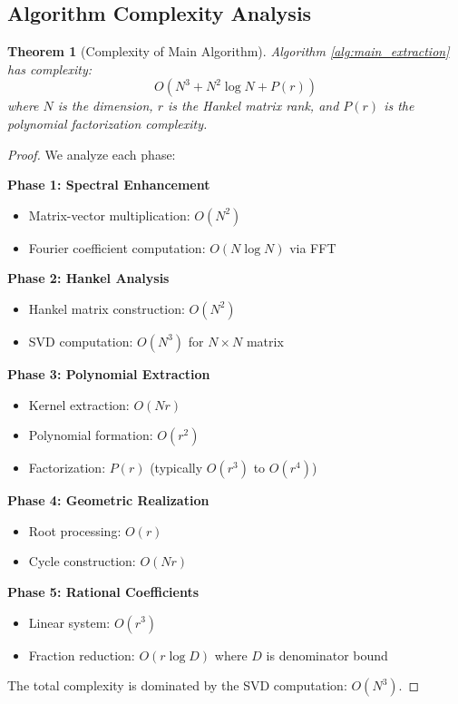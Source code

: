 \documentclass[11pt,a4paper]{article}
\theoremstyle{plain}
\newtheorem{theorem}{Theorem}[section]
\theoremstyle{definition}
\theoremstyle{remark}
\begin{document}
\subsection{Algorithm Complexity Analysis}

\begin{theorem}[Complexity of Main Algorithm]
Algorithm \ref{alg:main_extraction} has complexity:
\begin{equation}
O(N^3 + N^2 \log N + P(r))
\end{equation}
where $N$ is the dimension, $r$ is the Hankel matrix rank, and $P(r)$ is the polynomial factorization complexity.
\end{theorem}

\begin{proof}
We analyze each phase:

\textbf{Phase 1: Spectral Enhancement}
\begin{itemize}
\item Matrix-vector multiplication: $O(N^2)$
\item Fourier coefficient computation: $O(N \log N)$ via FFT
\end{itemize}

\textbf{Phase 2: Hankel Analysis}
\begin{itemize}
\item Hankel matrix construction: $O(N^2)$
\item SVD computation: $O(N^3)$ for $N \times N$ matrix
\end{itemize}

\textbf{Phase 3: Polynomial Extraction}
\begin{itemize}
\item Kernel extraction: $O(Nr)$
\item Polynomial formation: $O(r^2)$
\item Factorization: $P(r)$ (typically $O(r^3)$ to $O(r^4)$)
\end{itemize}

\textbf{Phase 4: Geometric Realization}
\begin{itemize}
\item Root processing: $O(r)$
\item Cycle construction: $O(Nr)$
\end{itemize}

\textbf{Phase 5: Rational Coefficients}
\begin{itemize}
\item Linear system: $O(r^3)$
\item Fraction reduction: $O(r \log D)$ where $D$ is denominator bound
\end{itemize}

The total complexity is dominated by the SVD computation: $O(N^3)$.
\end{proof}
\end{document}
